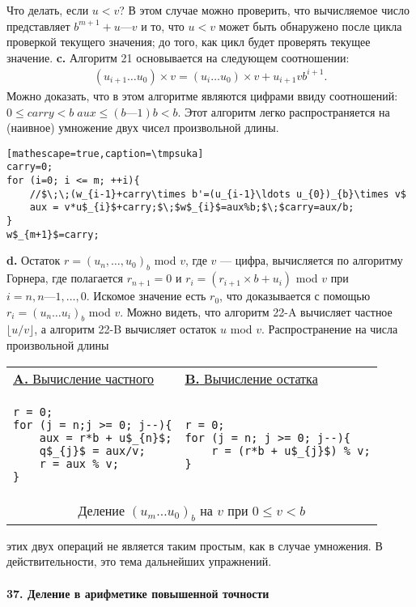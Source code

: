 \newline \indent Что делать, если $u < v$? В этом случае можно проверить, что вычисляемое число представляет $b^{m+1} + u — v$ и то, что $u < v$ может быть обнаружено после цикла проверкой текущего значения; до того, как цикл будет проверять текущее значение.
\newline \newline \indent
\textbf{c.} Алгоритм 21 основывается на следующем соотношении:
\begin{align*}
(u_{i+1} \dots u_0) \times v = (u_i \dots u_0) \times v + u_{i+1} v b^{i+1}.
\end{align*}
\newline
\noindent Можно доказать, что в этом алгоритме являются цифрами ввиду
соотношений: $0\leqslant carry < b\;aux\leqslant(b —1)b < b$. Этот алгоритм легко распространяется на (наивное) умножение двух чисел произвольной
длины.
\def\tmpsuka{Вычисление $v\times(u_{m}\ldots u_{0})_b,0\leqslant v<b$}

\begin{lstlisting}[mathescape=true,caption=\tmpsuka]
carry=0;
for (i=0; i <= m; ++i){
	//$\;\;(w_{i-1}+carry\times b'=(u_{i-1}\ldots u_{0})_{b}\times v$
	aux = v*u$_{i}$+carry;$\;$w$_{i}$=aux%b;$\;$carry=aux/b;
}
w$_{m+1}$=carry;
\end{lstlisting}

\textbf{d.} Остаток $r = (u_{n},\ldots,u_{0})_{b}$ mod $v$, где $v$ — цифра, вычисляется по
алгоритму Горнера, где полагается $r_{n+1} = 0$ и $r_{i} = (r_{i+1}\times b + u_{i})$ mod $v$
при $i = n,n—1,\ldots,0$. Искомое значение есть $r_{0}$, что доказывается
с помощью $r_{i}=(u_{n}\ldots u_{i})_{b}$ mod $v$. Можно видеть, что алгоритм 22-A
вычисляет частное $\lfloor u/v\rfloor$, а алгоритм 22-B вычисляет остаток $u$ mod $v$.
Распространение на числа произвольной длины
\begin{table}[h!]
\centering
\begin{tabular}{|l|l|}
\hline
\underline{\textbf{A.} Вычисление частного} & \underline{\textbf{B.} Вычисление остатка} \\
{\begin{lstlisting}[mathescape=true, frame=none]
r = 0;
for (j = n;j >= 0; j--){
	aux = r*b + u$_{n}$;
	q$_{j}$ = aux/v;
	r = aux % v;
}	
\end{lstlisting}} & 
{\begin{lstlisting}[mathescape=true, frame=none]
r = 0;
for (j = n; j >= 0; j--){
	r = (r*b + u$_{j}$) % v;
}
\end{lstlisting}}	
\\ \hline

\multicolumn{2}{c}{{\large Деление $(u_{m}\ldots u_{0})_b$ на $v$ при $0\leqslant v<b$}}
\end{tabular}
\end{table}
этих двух операций не является таким простым, как в случае умноже­ния. В действительности, это тема дальнейших упражнений.
\\\\
\noindent\textbf{37. Деление в арифметике повышенной точности}
\\

